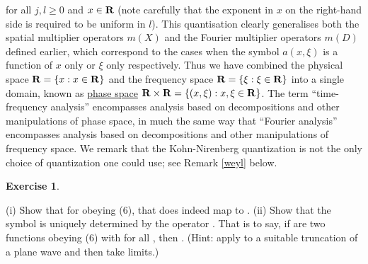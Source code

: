 \documentclass[11pt]{article}
\theoremstyle{definition}
\newtheorem{exercise}[theorem]{Exercise}
\theoremstyle{remark}
\begin{document}
 for all \({j,l \geq 0}\) and \({x \in {\bf R}}\) (note carefully that the exponent in \({x}\) on the right-hand side is required to be uniform in \({l}\)). This quantisation clearly generalises both the spatial multiplier operators \({m(X)}\) and the Fourier multiplier operators \({m(D)}\) defined earlier, which correspond to the cases when the symbol \({a(x,\xi)}\) is a function of \({x}\) only or \({\xi}\) only respectively. Thus we have combined the physical space \({{\bf R} = \{ x: x \in {\bf R}\}}\) and the frequency space \({{\bf R} = \{ \xi: \xi \in {\bf R}\}}\) into a single domain, known as \href{https://en.wikipedia.org/wiki/Phase_space}{phase space} \({{\bf R} \times {\bf R} = \{ (x,\xi): x,\xi \in {\bf R} \}}\). The term “time-frequency analysis” encompasses analysis based on decompositions and other manipulations of phase space, in much the same way that “Fourier analysis” encompasses analysis based on decompositions and other manipulations of frequency space. We remark that the Kohn-Nirenberg quantization is not the only choice of quantization one could use; see Remark \ref{weyl} below.
\begin{exercise}
 \label{unq} 

(i) Show that for  obeying (6), that  does indeed map  to . 
(ii) Show that the symbol  is uniquely determined by the operator . That is to say, if  are two functions obeying (6) with  for all , then . (Hint: apply  to a suitable truncation of a plane wave  and then take limits.)



\end{exercise}
\end{document}

